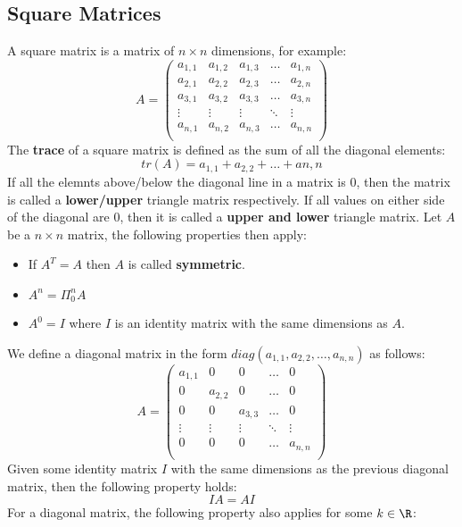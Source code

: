 \documentclass[a4paper]{article}
\begin{document}
  \subsection{Square Matrices}\label{squaremat}
  A square matrix is a matrix of $n \times n$ dimensions, for example:
  \[
    A = \begin{pmatrix}
      a_{1,1} & a_{1,2} & a_{1,3}& \dots & a_{1,n} \\
      a_{2,1} & a_{2,2} & a_{2,3}&\dots & a_{2,n} \\
      a_{3,1} & a_{3,2} & a_{3,3}&\dots & a_{3,n} \\
      \vdots & \vdots & \vdots&\ddots & \vdots\\
      a_{n,1} & a_{n,2} & a_{n,3}&\dots & a_{n,n} \\
    \end{pmatrix}
  \]
  The \textbf{trace} of a square matrix is defined as the sum of all the diagonal elements:
  \[
    tr(A) = a_{1,1} + a_{2,2} + \dots + a{n,n}
  \]
  If all the elemnts above/below the diagonal line in a matrix is 0, then the matrix is called a \textbf{lower/upper} triangle matrix respectively. If all values on either side of the diagonal are 0, then it is called a \textbf{upper and lower} triangle matrix.
  \newpage
  Let $A$ be a $n\times n $ matrix, the following properties then apply:
  \begin{itemize}
    \item If $A^T = A$ then $A$ is called \textbf{symmetric}.
    \item $A^n = \Pi^n_0 A$ 
    \item $A^0 = I$ where $I$ is an identity matrix with the same dimensions as $A$.
  \end{itemize}
  We define a diagonal matrix in the form $diag(a_{1,1},a_{2,2},\dots,a_{n,n})$ as follows:
  \[
    A = \begin{pmatrix}
      a_{1,1} & 0 & 0& \dots & 0 \\
      0 & a_{2,2} & 0&\dots & 0 \\
      0 & 0 & a_{3,3}&\dots & 0 \\
      \vdots & \vdots & \vdots&\ddots & \vdots\\
      0 & 0 & 0&\dots & a_{n,n} \\
    \end{pmatrix}
  \]
  Given some identity matrix $I$ with the same dimensions as the previous diagonal matrix, then the following property holds:
  \[
    IA = AI
  \]
  For a diagonal matrix, the following property also applies for some $k\in \R$:
\end{document}
